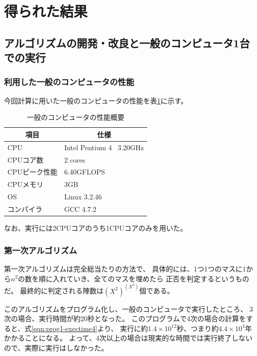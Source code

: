 \section{得られた結果}
\subsection{アルゴリズムの開発・改良と一般のコンピュータ1台での実行}
\subsubsection{利用した一般のコンピュータの性能}
今回計算に用いた一般のコンピュータの性能を表\ref{tb:normalpc-perf}に示す。

\begin{table}[htb]
	\begin{center}
	\begin{tabular}{|l|l|}
\hline \hline
\multicolumn{1}{|c|}{項目} & \multicolumn{1}{|c|}{仕様} \\
\hline \hline
CPU & Intel Pentium 4 \ 3.20GHz \\
CPUコア数 & 2 cores \\
CPUピーク性能 & 6.40GFLOPS \\
CPUメモリ & 3GB \\
OS & Linux 3.2.46 \\
コンパイラ & GCC 4.7.2 \\
\hline
	\end{tabular}
	\end{center}
	\caption{一般のコンピュータの性能概要}
	\label{tb:normalpc-perf}
\end{table}

なお、実行には2CPUコアのうち1CPUコアのみを用いた。


\subsubsection{第一次アルゴリズム}
第一次アルゴリズムは完全総当たりの方法で、
具体的には、1つ1つのマスに$1$から$n^2$の数を順に入れていき、全てのマスを埋めたら
正否を判定するというものだ。
最終的に判定される陣数は$(X^2)^{(X^2)}$個である。

このアルゴリズムをプログラム化し、一般のコンピュータで実行したところ、
3次の場合、実行時間が約20秒となった。
このプログラムで4次の場合の計算をすると、式\ref{eqn:prog1-exectime4}より、
実行に約$1.4 \times 10^{12}$秒、つまり約$4.4 \times 10^4$年かかることになる。
よって、4次以上の場合は現実的な時間では実行終了しないので、実際に実行はしなかった。

